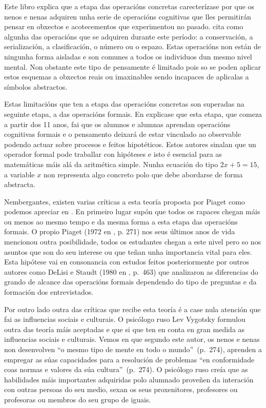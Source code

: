  Este libro explica que a etapa das operacións concretas carecterízase por que os nenos e nenas adquiren unha serie de operacións cognitivas que lles permitirán pensar en obxectos e acotecementos que experimentou no pasado.  cita como algunha das operacións que se adquiren durante este período: a conservación, a serialización, a clasificación, o número ou o espazo. Estas operacións non están de ningunha forma aisladas e son comunes a todos os individuos dun mesmo nivel mental. Non obstante este tipo de pensamente é limitado pois so se poden aplicar estos esquemas a obxectos reais ou imaxinables sendo incapaces de aplicalas a símbolos abstractos.

Estas limitacións que ten a etapa das operacións concretas son superadas na seguinte etapa, a das operacións formais. En  explicase que esta etapa, que comeza a partir dos 11 anos, fai que os alumnos e alumnas aprendan operacións cognitivas formais e o pensamento deixará de estar vinculado ao observable podendo actuar sobre procesos e feitos hipotéticos. Estos autores sinalan que un operador formal pode traballar con hipóteses e isto é esencial para as matemáticas máis alá da aritmética simple. Nunha ecuación do tipo $2x + 5 = 15$, a variable $x$ non representa algo concreto polo que debe abordarse de forma abstracta.

Nembergantes, existen varias críticas a esta teoría proposta por Piaget como podemos apreciar en . En primeiro lugar supón que todos os rapaces chegan máis ou menos ao mesmo tempo e da mesma forma a esta etapa das operacións formais. O propio Piaget (1972 en , p. 271) nos seus últimos anos de vida mencionou outra posibilidade, todos os estudantes chegan a este nivel pero so nos asuntos que son do seu interese ou que teñan unha importancia vital para eles. Esta hipótese vai en consonancia con estudos feitos posteriormente por outros autores como DeLisi e Staudt (1980 en , p.~463) que analizaron as diferencias do grando de alcance das operacións formais dependendo do tipo de preguntas e da formación dos entrevistados.

Por outro lado outra das críticas que recibe esta teoría é a case nula atención que fai as influencias sociais e culturais. O psicólogo ruso Lev Vygotsky formulou outra das teoría máis aceptadas e que si que ten en conta en gran medida as influencias sociais e culturais. Vemos en  que segundo este autor, os nenos e nenas non desenvolven ``o mesmo tipo de mente en todo o mundo''~(p.~274), aprenden a empregar as súas capacidades para a resolución de problemas ``en conformidade coas normas e valores da súa cultura''~(p.~274). O psicólogo ruso creía que as habilidades máis importantes adquiridas polo alumnado proveñen da interación con outras persoas do seu medio, sexan os seus proxenitores, profesores ou profesoras ou membros do seu grupo de iguais.

